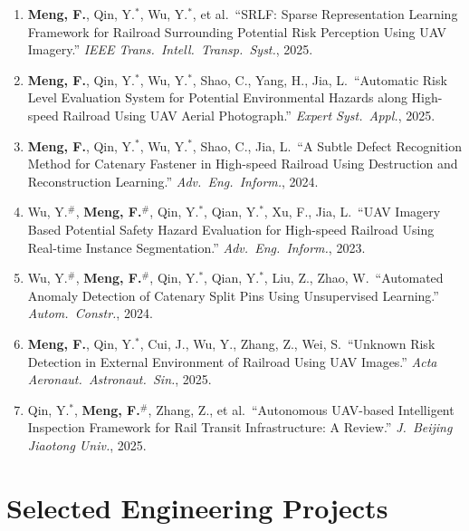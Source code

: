 \documentclass[11pt,a4paper]{article}
\begin{document}
\begin{enumerate}[leftmargin=*,nosep,itemsep=1.5pt]
  \item \textbf{Meng, F.}, Qin, Y.$^*$, Wu, Y.$^*$, et al.\
    ``SRLF: Sparse Representation Learning Framework for Railroad Surrounding Potential Risk Perception Using UAV Imagery.''
    \textit{IEEE Trans.\ Intell.\ Transp.\ Syst.}, 2025.

  \item \textbf{Meng, F.}, Qin, Y.$^*$, Wu, Y.$^*$, Shao, C., Yang, H., Jia, L.\
    ``Automatic Risk Level Evaluation System for Potential Environmental Hazards along High-speed Railroad Using UAV Aerial Photograph.''
    \textit{Expert Syst.\ Appl.}, 2025.

  \item \textbf{Meng, F.}, Qin, Y.$^*$, Wu, Y.$^*$, Shao, C., Jia, L.\
    ``A Subtle Defect Recognition Method for Catenary Fastener in High-speed Railroad Using Destruction and Reconstruction Learning.''
    \textit{Adv.\ Eng.\ Inform.}, 2024.

  \item Wu, Y.$^\#$, \textbf{Meng, F.}$^\#$, Qin, Y.$^*$, Qian, Y.$^*$, Xu, F., Jia, L.\
    ``UAV Imagery Based Potential Safety Hazard Evaluation for High-speed Railroad Using Real-time Instance Segmentation.''
    \textit{Adv.\ Eng.\ Inform.}, 2023.

  \item Wu, Y.$^\#$, \textbf{Meng, F.}$^\#$, Qin, Y.$^*$, Qian, Y.$^*$, Liu, Z., Zhao, W.\
    ``Automated Anomaly Detection of Catenary Split Pins Using Unsupervised Learning.''
    \textit{Autom.\ Constr.}, 2024.

  \item \textbf{Meng, F.}, Qin, Y.$^*$, Cui, J., Wu, Y., Zhang, Z., Wei, S.\
    ``Unknown Risk Detection in External Environment of Railroad Using UAV Images.''
    \textit{Acta Aeronaut.\ Astronaut.\ Sin.}, 2025.

  \item Qin, Y.$^*$, \textbf{Meng, F.}$^\#$, Zhang, Z., et al.\
    ``Autonomous UAV-based Intelligent Inspection Framework for Rail Transit Infrastructure: A Review.''
    \textit{J.\ Beijing Jiaotong Univ.}, 2025.
\end{enumerate}

\section{Selected Engineering Projects}
\end{document}
